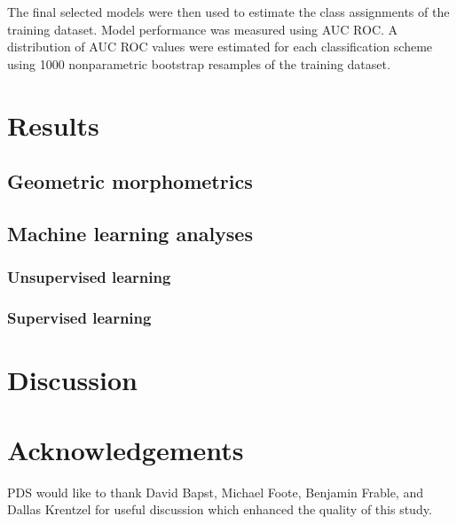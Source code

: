 \documentclass[12pt]{article}\usepackage{graphicx, color}
\begin{document}
The final selected models were then used to estimate the class assignments of the training dataset. Model performance was measured using AUC ROC. A distribution of AUC ROC values were estimated for each classification scheme using 1000 nonparametric bootstrap resamples of the training dataset.

\section{Results}
\subsection{Geometric morphometrics}

\subsection{Machine learning analyses}
\subsubsection{Unsupervised learning}

\subsubsection{Supervised learning}
%


\section{Discussion}


\section*{Acknowledgements}
PDS would like to thank David Bapst, Michael Foote, Benjamin Frable, and Dallas Krentzel for useful discussion which enhanced the quality of this study.



\end{document}

